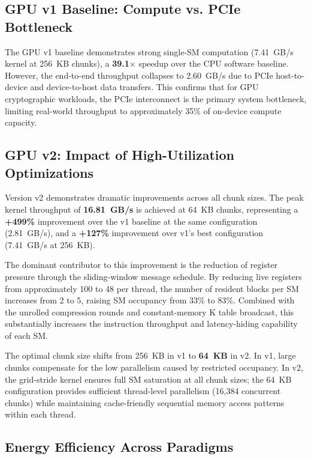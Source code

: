 \subsection{GPU v1 Baseline: Compute vs. PCIe Bottleneck}

The GPU v1 baseline demonstrates strong single-SM computation (7.41~GB/s kernel at 256~KB chunks), a \textbf{39.1$\times$} speedup over the CPU software baseline. However, the end-to-end throughput collapses to 2.60~GB/s due to PCIe host-to-device and device-to-host data transfers. This confirms that for GPU cryptographic workloads, the PCIe interconnect is the primary system bottleneck, limiting real-world throughput to approximately 35\% of on-device compute capacity.

\subsection{GPU v2: Impact of High-Utilization Optimizations}

Version v2 demonstrates dramatic improvements across all chunk sizes. The peak kernel throughput of \textbf{16.81~GB/s} is achieved at 64~KB chunks, representing a \textbf{+499\%} improvement over the v1 baseline at the same configuration (2.81~GB/s), and a \textbf{+127\%} improvement over v1's best configuration (7.41~GB/s at 256~KB).

The dominant contributor to this improvement is the reduction of register pressure through the sliding-window message schedule. By reducing live registers from approximately 100 to 48 per thread, the number of resident blocks per SM increases from 2 to 5, raising SM occupancy from 33\% to 83\%. Combined with the unrolled compression rounds and constant-memory K table broadcast, this substantially increases the instruction throughput and latency-hiding capability of each SM.

The optimal chunk size shifts from 256~KB in v1 to \textbf{64~KB} in v2. In v1, large chunks compensate for the low parallelism caused by restricted occupancy. In v2, the grid-stride kernel ensures full SM saturation at all chunk sizes; the 64~KB configuration provides sufficient thread-level parallelism (16,384 concurrent chunks) while maintaining cache-friendly sequential memory access patterns within each thread.

\subsection{Energy Efficiency Across Paradigms}


